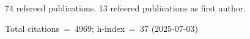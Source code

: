 74 refereed publications. 13 refeered publications as first author.

Total citations~=~4969; h-index~=~37 (2025-07-03)